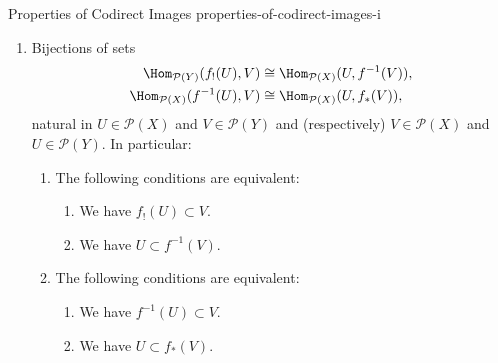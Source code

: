 \begin{proposition}{Properties of Codirect Images \rmI}{properties-of-codirect-images-i}
\begin{enumerate}
\begin{enumerate}
\[\begin{gathered}
                            f_{!}(f^{-1}(V)) \subset V,
                        \end{gathered}
                        \qquad
                        \begin{gathered}
                            V                \subset f_{*}(f^{-1}(V)),\\
                            f^{-1}(f_{*}(U)) \subset U
                        \end{gathered}
                    \]%
                    indexed by $U\in\mathcal{P}(X)$ and $V\in\mathcal{P}(Y)$.
                \item\label{properties-of-codirect-images-i-triple-adjointness-2}Bijections of sets
                    \begin{align*}
                        \Hom_{\mathcal{P}(Y)}(f_{!}(U),V)  &\cong \Hom_{\mathcal{P}(X)}(U,f^{-1}(V)),\\
                        \Hom_{\mathcal{P}(X)}(f^{-1}(U),V) &\cong \Hom_{\mathcal{P}(X)}(U,f_{*}(V)),
                    \end{align*}
                    natural in $U\in\mathcal{P}(X)$ and $V\in\mathcal{P}(Y)$ and (respectively) $V\in\mathcal{P}(X)$ and $U\in\mathcal{P}(Y)$. In particular:
                    \begin{enumerate}
                        \item\label{properties-of-codirect-images-i-triple-adjointness-2-a}The following conditions are equivalent:
                            \begin{enumerate}
                                \item\label{properties-of-codirect-images-i-triple-adjointness-2-a-i}We have $f_{!}(U)\subset V$.
                                \item\label{properties-of-codirect-images-i-triple-adjointness-2-a-ii}We have $U\subset f^{-1}(V)$.
                            \end{enumerate}
                        \item\label{properties-of-codirect-images-i-triple-adjointness-2-b}The following conditions are equivalent:
                            \begin{enumerate}
                                \item\label{properties-of-codirect-images-i-triple-adjointness-2-b-i}We have $f^{-1}(U)\subset V$.
                                \item\label{properties-of-codirect-images-i-triple-adjointness-2-b-ii}We have $U\subset f_{*}(V)$.

\end{enumerate}
\end{enumerate}
\end{enumerate}
\end{enumerate}
\end{proposition}
